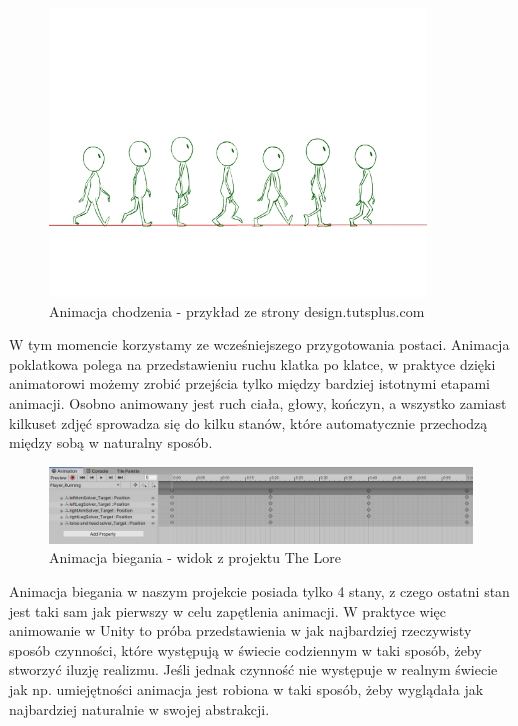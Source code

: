 \documentclass[oneside,polski,logo]{amuthesis}
\begin{document}
\begin{figure}[h]
	\centering
	\includegraphics[width=10cm]{images/kozubal/walkingAnimation.jpg}
	\caption{Animacja chodzenia - przykład ze strony design.tutsplus.com}
\end{figure}

\newpage W tym momencie korzystamy ze wcześniejszego przygotowania postaci. Animacja poklatkowa polega na przedstawieniu ruchu klatka po klatce, w praktyce dzięki animatorowi możemy zrobić przejścia tylko między bardziej istotnymi etapami animacji. Osobno animowany jest ruch ciała, głowy, kończyn, a wszystko zamiast kilkuset zdjęć sprowadza się do kilku stanów, które automatycznie przechodzą między sobą w naturalny sposób.

\begin{figure}[h]
	\centering
	\includegraphics[width=13cm]{images/kozubal/runningAnimation.jpg}
	\caption{Animacja biegania - widok z projektu The Lore}
\end{figure}

Animacja biegania w naszym projekcie posiada tylko 4 stany, z czego ostatni stan jest taki sam jak pierwszy w celu zapętlenia animacji. W praktyce więc animowanie w Unity to próba przedstawienia w jak najbardziej rzeczywisty sposób czynności, które występują w świecie codziennym w taki sposób, żeby stworzyć iluzję realizmu. Jeśli jednak czynność nie występuje w realnym świecie jak np. umiejętności animacja jest robiona w taki sposób, żeby wyglądała jak najbardziej naturalnie w swojej abstrakcji.
\end{document}
